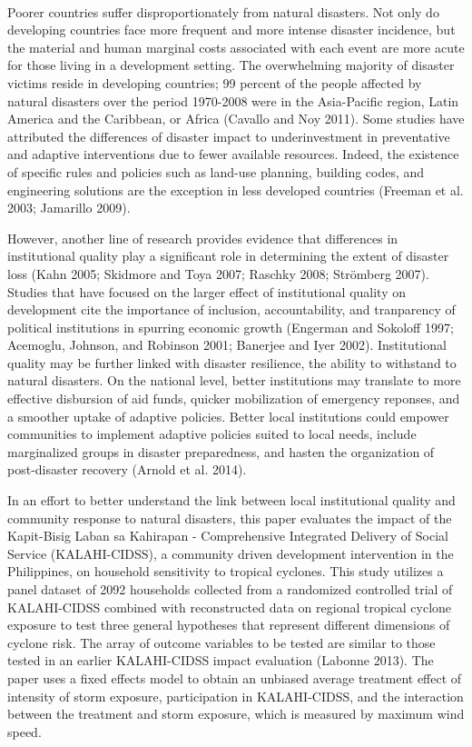 \documentclass[12pt]{article}
\begin{document}
	\paragraph{ } Poorer countries suffer disproportionately from natural disasters. Not only do developing countries face more frequent and more intense disaster incidence, but the material and human marginal costs associated with each event are more acute for those living in a development setting. The overwhelming majority of disaster victims reside in developing countries; 99 percent of the people affected by natural disasters over the period 1970-2008 were in the Asia-Pacific region, Latin America and the Caribbean, or Africa (Cavallo and Noy 2011). Some studies have attributed the differences of disaster impact to underinvestment in preventative and adaptive interventions due to fewer available resources. Indeed, the existence of specific rules and policies such as land-use planning, building codes, and engineering solutions are the exception in less developed countries (Freeman et al. 2003; Jamarillo 2009). 

	However, another line of research provides evidence that differences in institutional quality play a significant role in determining the extent of disaster loss (Kahn 2005; Skidmore and Toya 2007; Raschky 2008; Strömberg 2007). Studies that have focused on the larger effect of institutional quality on development cite the importance of inclusion, accountability, and tranparency of political institutions in spurring economic growth (Engerman and Sokoloff 1997; Acemoglu, Johnson, and Robinson 2001; Banerjee and Iyer 2002). Institutional quality may be further linked with disaster resilience, the ability to withstand to natural disasters. On the national level, better institutions may translate to more effective disbursion of aid funds, quicker mobilization of emergency reponses, and a smoother uptake of adaptive policies. Better local institutions could empower communities to implement adaptive policies suited to local needs, include marginalized groups in disaster preparedness, and hasten the organization of post-disaster recovery (Arnold et al. 2014).

	In an effort to better understand the link between local institutional quality and community response to natural disasters, this paper evaluates the impact of the Kapit-Bisig Laban sa Kahirapan - Comprehensive Integrated Delivery of Social Service (KALAHI-CIDSS), a community driven development intervention in the Philippines, on household sensitivity to tropical cyclones. This study utilizes a panel dataset of 2092 households collected from a randomized controlled trial of KALAHI-CIDSS combined with reconstructed data on regional tropical cyclone exposure to test three general hypotheses that represent different dimensions of cyclone risk. The array of outcome variables to be tested are similar to those tested in an earlier KALAHI-CIDSS impact evaluation (Labonne 2013). The paper uses a fixed effects model to obtain an unbiased average treatment effect of intensity of storm exposure, participation in KALAHI-CIDSS, and the interaction between the treatment and storm exposure, which is measured by maximum wind speed. 
\end{document}
